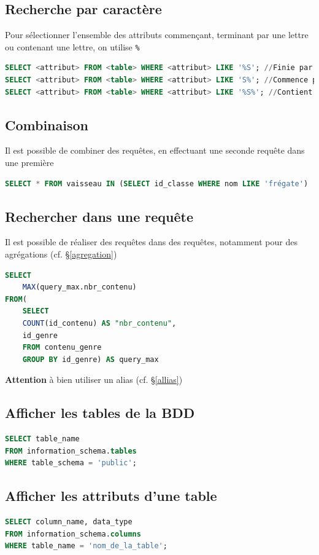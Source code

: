 \subsection{Recherche par caractère}
Pour sélectionner l'ensemble des attributs commençant, terminant par une lettre ou contenant une lettre, on utilise \texttt{\%}
\begin{lstlisting}[language=SQL]
SELECT <attribut> FROM <table> WHERE <attribut> LIKE '%S'; //Finie par S
SELECT <attribut> FROM <table> WHERE <attribut> LIKE 'S%'; //Commence par S
SELECT <attribut> FROM <table> WHERE <attribut> LIKE '%S%'; //Contient S
\end{lstlisting}

\subsection{Combinaison}
Il est possible de combiner des requêtes, en effectuant une seconde requête dans une première
\begin{lstlisting}[language=SQL]
SELECT * FROM vaisseau IN (SELECT id_classe WHERE nom LIKE 'frégate')
\end{lstlisting}

\subsection{Rechercher dans une requête}
Il est possible de réaliser des requêtes dans des requêtes, notamment pour des agrégations (cf. §\ref{agregation})
\begin{lstlisting}[language=SQL]
SELECT 
    MAX(query_max.nbr_contenu)
FROM(
    SELECT
	COUNT(id_contenu) AS "nbr_contenu", 
	id_genre
    FROM contenu_genre 
    GROUP BY id_genre) AS query_max
\end{lstlisting}
\textbf{Attention} à bien utiliser un alias (cf. §\ref{allias})

\subsection{Afficher les tables de la BDD}
\begin{lstlisting}[language=SQL]
SELECT table_name
FROM information_schema.tables
WHERE table_schema = 'public';
\end{lstlisting}

\subsection{Afficher les attributs d'une table}
\begin{lstlisting}[language=SQL]
SELECT column_name, data_type
FROM information_schema.columns
WHERE table_name = 'nom_de_la_table';
\end{lstlisting}

